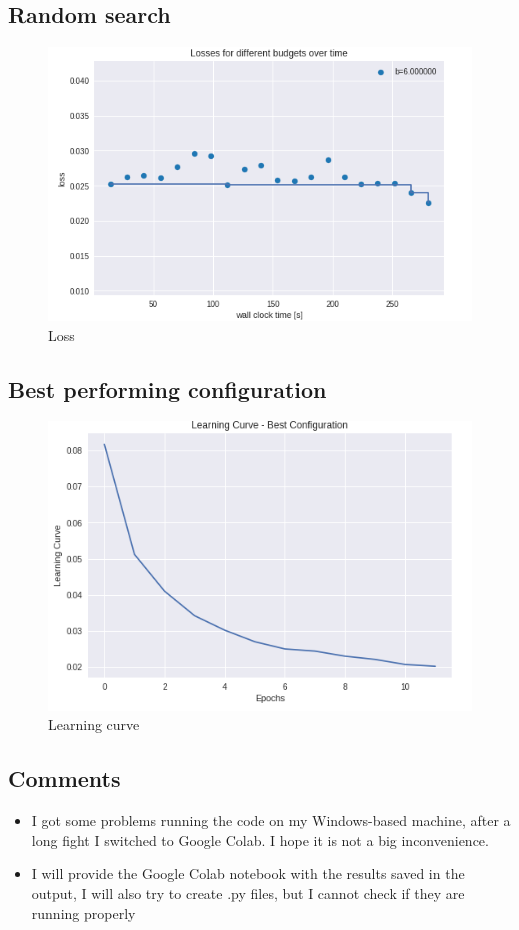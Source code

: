 \documentclass{scrartcl}
\begin{document}
\subsection*{Random search}

\begin{figure}[H]
	\centering
	\includegraphics[scale=0.6]{4}
	\caption{Loss}
	\label{fig:4}
\end{figure}

\subsection*{Best performing configuration}

\begin{figure}[H]
	\centering
	\includegraphics[scale=0.6]{5}
	\caption{Learning curve}
	\label{fig:5}
\end{figure}


\subsection*{Comments}

\begin{itemize}
	\item I got some problems running the code on my Windows-based machine, after a long fight I switched to Google Colab. I hope it is not a big inconvenience.
	\item I will provide the Google Colab notebook with the results saved in the output, I will also try to create .py files, but I cannot check if they are running properly
\end{itemize}
\end{document}
